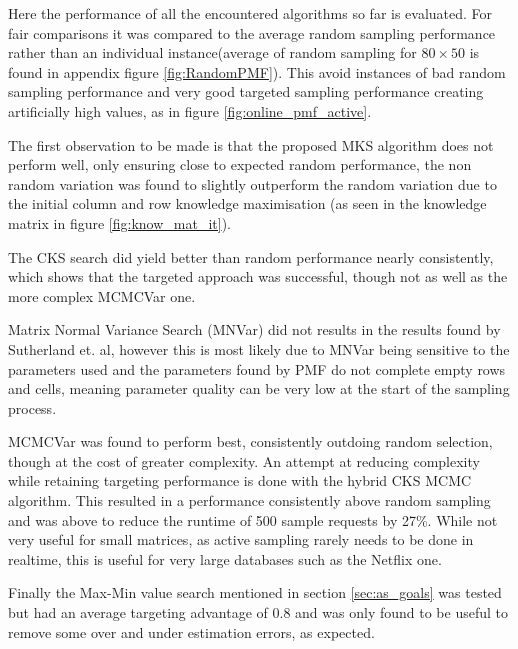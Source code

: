 Here the performance of all the encountered algorithms so far is evaluated. For fair comparisons it was compared to the average random sampling performance rather than an individual instance(average of random sampling for $80 \times 50$ is found in appendix figure \ref{fig:RandomPMF}). This avoid instances of bad random sampling performance and very good targeted sampling performance creating artificially high values, as in figure \ref{fig:online_pmf_active}.

The first observation to be made is that the proposed MKS algorithm does not perform well, only ensuring close to expected random performance, the non random variation was found to slightly outperform the random variation due to the initial column and row knowledge maximisation (as seen in the knowledge matrix in figure \ref{fig:know_mat_it}).

The CKS search did yield better than random performance nearly consistently, which shows that the targeted approach was successful, though not as well as the more complex MCMCVar one.

Matrix Normal Variance Search (MNVar) did not results in the results found by Sutherland et. al, however this is most likely due to MNVar being sensitive to the parameters used and the parameters found by PMF do not complete empty rows and cells, meaning parameter quality can be very low at the start of the sampling process.

MCMCVar was found to perform best, consistently outdoing random selection, though at the cost of greater complexity. An attempt at reducing complexity while retaining targeting performance is done with the hybrid CKS MCMC algorithm. This resulted in a performance consistently above random sampling and was above to reduce the runtime of 500 sample requests by 27\%. While not very useful for small matrices, as active sampling rarely needs to be done in realtime, this is useful for very large databases such as the Netflix one.


Finally the Max-Min value search mentioned in section \ref{sec:as_goals} was tested but had an average targeting advantage of 0.8 and was only found to be useful to remove some over and under estimation errors, as expected.


